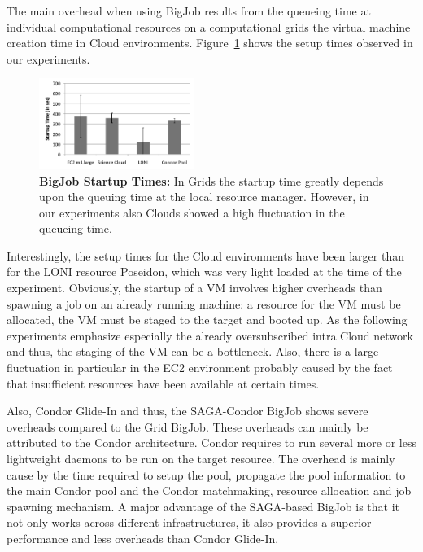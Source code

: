 \documentclass[conference,final]{IEEEtran}
\begin{document}
The main overhead when using BigJob results from the queueing time at
individual computational resources on a computational grids the
virtual machine creation time in Cloud
environments. Figure~\ref{fig:performance_setup_time} shows the setup
times observed in our experiments.
\begin{figure}[htbp]
    \centering
        \includegraphics[width=0.45\textwidth]{performance/setup_time_xls.pdf}
    \caption{\textbf{BigJob Startup Times:} In Grids the startup time
      greatly depends upon the queuing time at the local resource
      manager. However, in our experiments also Clouds showed a high
      fluctuation in the queueing time.}
    \label{fig:performance_setup_time}
\end{figure}

Interestingly, the setup times for the Cloud environments have been larger than 
for the LONI resource Poseidon, which was very light loaded at the time
of the experiment. Obviously, the startup of a VM involves higher overheads 
than spawning a job on an already running machine: a resource for the VM 
must be allocated, the VM must be staged to the target and booted up. As the following
experiments emphasize especially the already oversubscribed intra Cloud network
and thus, the staging of the VM can be a bottleneck. Also, there is a
large fluctuation in particular in the EC2 environment probably caused by 
the fact that insufficient resources have been available at certain times.

Also, Condor Glide-In and thus, the SAGA-Condor BigJob shows severe 
overheads compared to the Grid BigJob. These overheads can mainly be 
attributed to the Condor architecture. Condor requires to run several more or less 
lightweight daemons to be run on the target resource. The overhead is mainly 
cause by the time required to setup the pool, propagate the pool information 
to the main Condor pool and the Condor matchmaking, resource allocation and 
job spawning mechanism. A major advantage of the SAGA-based BigJob is that
it not only works across different infrastructures, it also provides a superior
performance and less overheads than Condor Glide-In.
\end{document}
